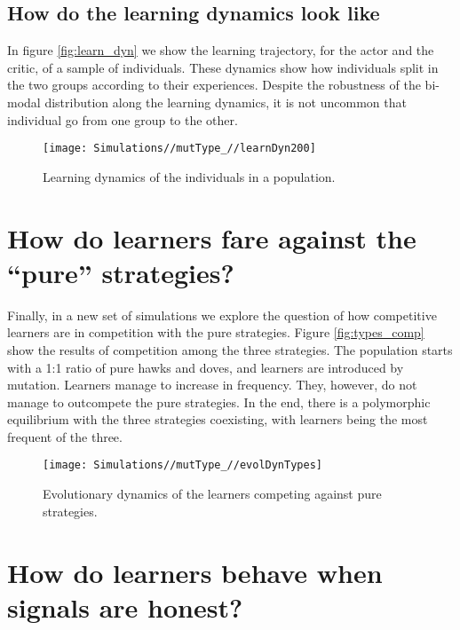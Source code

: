 \documentclass[]{article}
\begin{document}
\hypertarget{how-do-the-learning-dynamics-look-like}{%
\subsection{How do the learning dynamics look
like}\label{how-do-the-learning-dynamics-look-like}}

In figure \ref{fig:learn_dyn} we show the learning trajectory, for the
actor and the critic, of a sample of individuals. These dynamics show
how individuals split in the two groups according to their experiences.
Despite the robustness of the bi-modal distribution along the learning
dynamics, it is not uncommon that individual go from one group to the
other.

\begin{figure}
\texttt{[image: Simulations//mutType\_//learnDyn200]} \caption{\label{fig:learn_dyn}Learning dynamics of the individuals in a population.}\label{fig:fig7}
\end{figure}

\hypertarget{how-do-learners-fare-against-the-pure-strategies}{%
\section{How do learners fare against the ``pure''
strategies?}\label{how-do-learners-fare-against-the-pure-strategies}}

Finally, in a new set of simulations we explore the question of how
competitive learners are in competition with the pure strategies. Figure
\ref{fig:types_comp} show the results of competition among the three
strategies. The population starts with a 1:1 ratio of pure hawks and
doves, and learners are introduced by mutation. Learners manage to
increase in frequency. They, however, do not manage to outcompete the
pure strategies. In the end, there is a polymorphic equilibrium with the
three strategies coexisting, with learners being the most frequent of
the three.

\begin{figure}
\texttt{[image: Simulations//mutType\_//evolDynTypes]} \caption{\label{fig:types_comp}Evolutionary dynamics of the learners competing against pure strategies.}\label{fig:fig8}
\end{figure}

\hypertarget{how-do-learners-behave-when-signals-are-honest}{%
\section{How do learners behave when signals are
honest?}\label{how-do-learners-behave-when-signals-are-honest}}
\end{document}
